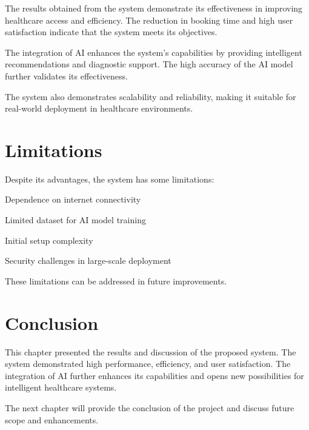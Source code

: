 The results obtained from the system demonstrate its effectiveness in improving healthcare access and efficiency. The reduction in booking time and high user satisfaction indicate that the system meets its objectives.

The integration of AI enhances the system’s capabilities by providing intelligent recommendations and diagnostic support. The high accuracy of the AI model further validates its effectiveness.

The system also demonstrates scalability and reliability, making it suitable for real-world deployment in healthcare environments.

\section{Limitations}

Despite its advantages, the system has some limitations:

Dependence on internet connectivity

Limited dataset for AI model training

Initial setup complexity

Security challenges in large-scale deployment

These limitations can be addressed in future improvements.

\section{Conclusion}

This chapter presented the results and discussion of the proposed system. The system demonstrated high performance, efficiency, and user satisfaction. The integration of AI further enhances its capabilities and opens new possibilities for intelligent healthcare systems.

The next chapter will provide the conclusion of the project and discuss future scope and enhancements.
